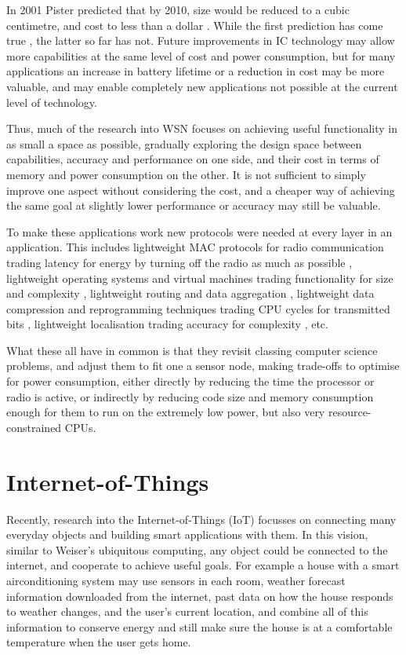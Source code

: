 In 2001 Pister predicted that by 2010, size would be reduced to a cubic centimetre, and cost to less than a dollar \cite{Pister:2001vr}. While the first prediction has come true \cite{Wang:2014cq}, the latter so far has not. Future improvements in IC technology may allow more capabilities at the same level of cost and power consumption, but for many applications an increase in battery lifetime or a reduction in cost may be more valuable, and may enable completely new applications not possible at the current level of technology.

Thus, much of the research into WSN focuses on achieving useful functionality in as small a space as possible, gradually exploring the design space between capabilities, accuracy and performance on one side, and their cost in terms of memory and power consumption on the other. It is not sufficient to simply improve one aspect without considering the cost, and a cheaper way of achieving the same goal at slightly lower performance or accuracy may still be valuable.

To make these applications work new protocols were needed at every layer in an application. This includes lightweight MAC protocols for radio communication trading latency for energy by turning off the radio as much as possible \cite{Ye:2002uv, vanDam:2018tr}, lightweight operating systems and virtual machines trading functionality for size and complexity \cite{Levis:2004ws, Gu:2006ww, Han:2005tha, Levis:2002ku, Brouwers:2009cj}, lightweight routing and data aggregation \cite{Intanogonwiwat:2018wz, Braginsky:2002wg}, lightweight data compression and reprogramming techniques trading CPU cycles for transmitted bits \cite{Marcelloni:2009ja, Reijers:2003ww}, lightweight localisation trading accuracy for complexity \cite{Niculescu:2001bl, Savarese:2002tx, Savvides:2002uf}, etc.

What these all have in common is that they revisit classing computer science problems, and adjust them to fit one a sensor node, making trade-offs to optimise for power consumption, either directly by reducing the time the processor or radio is active, or indirectly by reducing code size and memory consumption enough for them to run on the extremely low power, but also very resource-constrained CPUs.

\section{Internet-of-Things}
Recently, research into the Internet-of-Things (IoT) focusses on connecting many everyday objects and building smart applications with them. In this vision, similar to Weiser's ubiquitous computing, any object could be connected to the internet, and cooperate to achieve useful goals. For example a house with a smart airconditioning system may use sensors in each room, weather forecast information downloaded from the internet, past data on how the house responds to weather changes, and the user's current location, and combine all of this information to conserve energy and still make sure the house is at a comfortable temperature when the user gets home.

